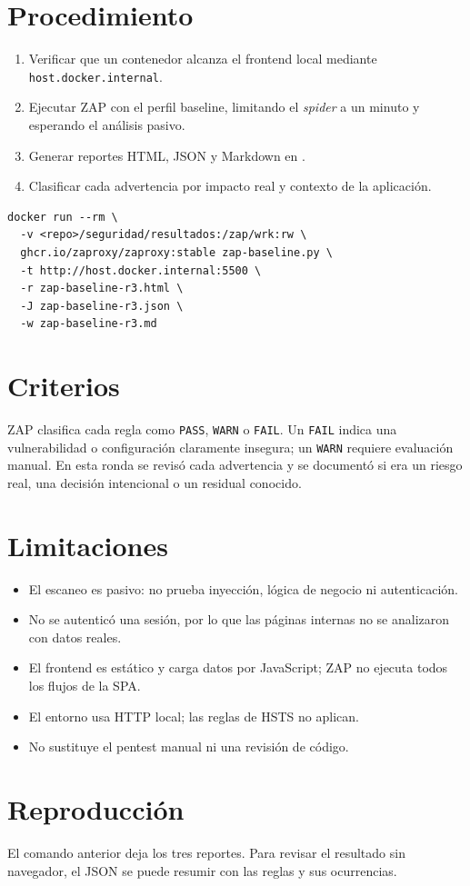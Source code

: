 \documentclass[11pt]{article}
\begin{document}
\section{Procedimiento}

\begin{enumerate}
  \item Verificar que un contenedor alcanza el frontend local mediante
  \texttt{host.docker.internal}.
  \item Ejecutar ZAP con el perfil baseline, limitando el \textit{spider} a un
  minuto y esperando el análisis pasivo.
  \item Generar reportes HTML, JSON y Markdown en
  .
  \item Clasificar cada advertencia por impacto real y contexto de la
  aplicación.
\end{enumerate}

\begin{verbatim}
docker run --rm \
  -v <repo>/seguridad/resultados:/zap/wrk:rw \
  ghcr.io/zaproxy/zaproxy:stable zap-baseline.py \
  -t http://host.docker.internal:5500 \
  -r zap-baseline-r3.html \
  -J zap-baseline-r3.json \
  -w zap-baseline-r3.md
\end{verbatim}

\section{Criterios}

ZAP clasifica cada regla como \texttt{PASS}, \texttt{WARN} o \texttt{FAIL}.
Un \texttt{FAIL} indica una vulnerabilidad o configuración claramente insegura;
un \texttt{WARN} requiere evaluación manual. En esta ronda se revisó cada
advertencia y se documentó si era un riesgo real, una decisión intencional o un
residual conocido.

\section{Limitaciones}

\begin{itemize}
  \item El escaneo es pasivo: no prueba inyección, lógica de negocio ni
  autenticación.
  \item No se autenticó una sesión, por lo que las páginas internas no se
  analizaron con datos reales.
  \item El frontend es estático y carga datos por JavaScript; ZAP no ejecuta
  todos los flujos de la SPA.
  \item El entorno usa HTTP local; las reglas de HSTS no aplican.
  \item No sustituye el pentest manual ni una revisión de código.
\end{itemize}

\section{Reproducción}

El comando anterior deja los tres reportes. Para revisar el resultado sin
navegador, el JSON se puede resumir con las reglas y sus ocurrencias.
\end{document}
